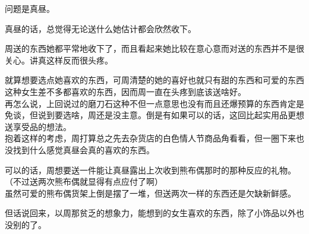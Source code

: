 问题是真昼。

真昼的话，总觉得无论送什么她估计都会欣然收下。

周送的东西她都平常地收下了，而且看起来她比较在意心意而对送的东西并不是很关心。讲真这样反而很头疼。

就算想要选点她喜欢的东西，可周清楚的她的喜好也就只有甜的东西和可爱的东西这种女生差不多都喜欢的东西，因而周一直在头疼到底该送啥好。\\

再怎么说，上回说过的磨刀石这种不但一点意思也没有而且还爆预算的东西肯定是免谈，但说到要选啥，周还是没主意。倒是有如果可以的话，这回比起实用品更想送享受品的想法。\\

抱着这样的考虑，周打算总之先去杂货店的白色情人节商品角看看，但一圈下来也没找到什么感觉真昼会真的喜欢的东西。

可以的话，周想要送一件能让真昼露出上次收到熊布偶那时的那种反应的礼物。\\

（不过送两次熊布偶就显得有点应付了啊）\\

虽然可爱的熊布偶货架上倒是摆了一堆，但送两次一样的东西还是欠缺新鲜感。

但话说回来，以周那贫乏的想象力，能想到的女生喜欢的东西，除了小饰品以外也没别的了。\\

